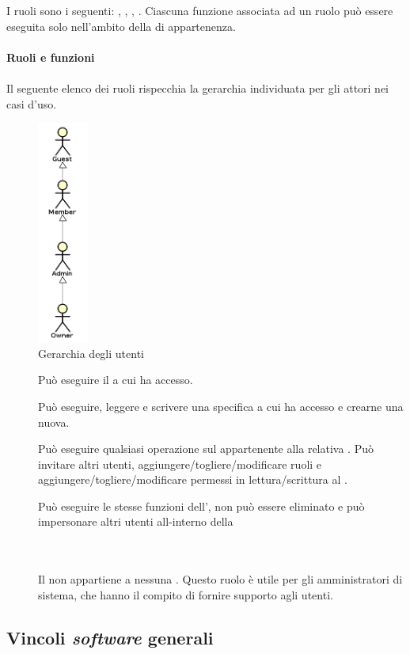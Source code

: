 \begin{description}
	I ruoli sono i seguenti: , , , .	
	Ciascuna funzione associata ad un ruolo pu\`o essere eseguita solo nell'ambito della  di appartenenza. \\\\
	\textbf{Ruoli e funzioni} \hfill \\\\
		Il seguente elenco dei ruoli rispecchia la gerarchia individuata per gli attori nei casi d'uso.
                 \begin{figure}[H]
                   \begin{center}
                     \includegraphics[width=0.15\textwidth]{res/img/UCUtenti/gerarchia_utenti.png}
                     \caption{Gerarchia degli utenti}
                   \end{center} 
                 \end{figure}  
		\begin{description}
			\item[] Pu\`o eseguire il  a cui ha accesso.
			\item[] Pu\`o eseguire, leggere e scrivere una specifica  a cui ha accesso e crearne una nuova.
			\item[] Pu\`o eseguire qualsiasi operazione sul  appartenente alla relativa . Pu\`o invitare altri utenti, aggiungere/togliere/modificare ruoli e aggiungere/togliere/modificare permessi in lettura/scrittura al .
			\item[] Pu\`o eseguire le stesse funzioni dell', non pu\`o essere eliminato e pu\`o impersonare altri utenti all-interno della 
                        \item[] \hfill \\\\
	Il  non appartiene a nessuna . Questo ruolo \`e utile per gli amministratori di sistema, che hanno il compito di fornire supporto agli utenti.
		\end{description}
\end{description}

\subsection{Vincoli \textit{software} generali}

\newpage

